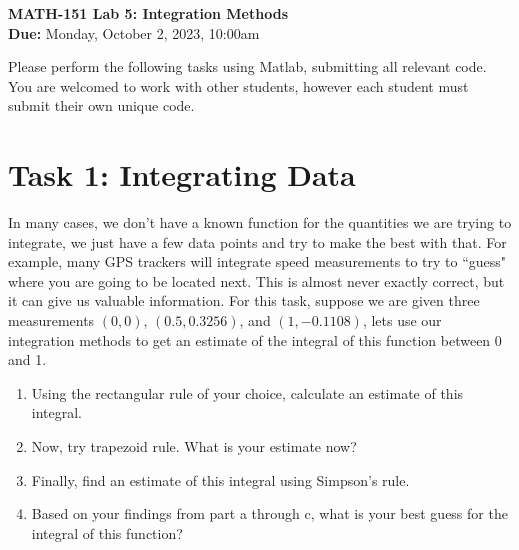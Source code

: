 \documentclass[11pt]{article}
\begin{document}
	
	\begin{center}
		\Large{\textbf{MATH-151 Lab 5: Integration Methods}}\\
			\medskip
		\normalsize{\textbf{Due:} Monday, October 2, 2023, 10:00am} 
	\end{center}
	\noindent\makebox[\linewidth]{\rule{\textwidth}{0.4pt}}
	Please perform the following tasks using Matlab, submitting all relevant code. You are welcomed to work with other students, however each student must submit their own unique code.
	\section*{Task 1: Integrating Data}
	\noindent In many cases, we don't have a known function for the quantities we are trying to integrate, we just have a few data points and try to make the best with that. For example, many GPS trackers will integrate speed measurements to try to ``guess" where you are going to be located next. This is almost never exactly correct, but it can give us valuable information. For this task, suppose we are given three measurements $(0,0)$, $(0.5,0.3256)$, and $(1,-0.1108)$, lets use our integration methods to get an estimate of the integral of this function between 0 and 1.
	\begin{enumerate}[label=\alph*)]
		\item Using the rectangular rule of your choice, calculate an estimate of this integral.
		\item Now, try trapezoid rule. What is your estimate now?
		\item Finally, find an estimate of this integral using Simpson's rule.
		\item Based on your findings from part a through c, what is your best guess for the integral of this function?
	\end{enumerate}
\end{document}
